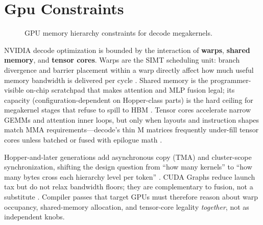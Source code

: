 \section{Gpu Constraints}
\label{sec:gpu_constraints}
\begin{figure}[t]
\centering
{}
\caption{GPU memory hierarchy constraints for decode megakernels.}
\label{fig:gpu_memory_hierarchy}
\end{figure}


NVIDIA decode optimization is bounded by the interaction of \textbf{warps}, \textbf{shared memory}, and \textbf{tensor cores}.
Warps are the SIMT scheduling unit: branch divergence and barrier placement within a warp directly affect how much useful memory bandwidth is delivered per cycle \citep{nvidia2022hopper}.
Shared memory is the programmer-visible on-chip scratchpad that makes attention and MLP fusion legal; its capacity (configuration-dependent on Hopper-class parts) is the hard ceiling for megakernel stages that refuse to spill to HBM \citep{nvidia2022hopper,semianalysis2024tma}.
Tensor cores accelerate narrow GEMMs and attention inner loops, but only when layouts and instruction shapes match MMA requirements---decode's thin M matrices frequently under-fill tensor cores unless batched or fused with epilogue math \citep{patel2025llminference,memoryfloor2026}.

Hopper-and-later generations add asynchronous copy (TMA) and cluster-scope synchronization, shifting the design question from ``how many kernels'' to ``how many bytes cross each hierarchy level per token'' \citep{semianalysis2024tma}.
CUDA Graphs reduce launch tax but do not relax bandwidth floors; they are complementary to fusion, not a substitute \citep{nvidia2024cudagraphs,memoryfloor2026}.
Compiler passes that target GPUs must therefore reason about warp occupancy, shared-memory allocation, and tensor-core legality \emph{together}, not as independent knobs.

